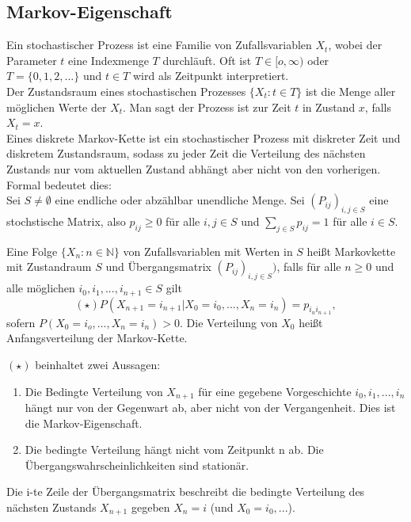 \documentclass[a4paper,12pt]{article}
\begin{document}
\subsection{Markov-Eigenschaft}
Ein stochastischer Prozess ist eine Familie von Zufallsvariablen $X_t$, wobei der Parameter $t$ eine Indexmenge $T$ durchläuft.
Oft ist $T \in [o,\infty )$ oder $T= \{0,1,2, ...\}$ und $t \in T$ wird als Zeitpunkt interpretiert.\\
Der Zustandsraum eines stochastischen Prozesses $\{ X_t: t \in T   \}$ ist die Menge aller möglichen Werte der $X_t$.
Man sagt der Prozess ist zur Zeit $t$ in Zustand $x$, falls $X_t =x$.\\
Eines diskrete Markov-Kette ist ein stochastischer Prozess mit diskreter Zeit und diskretem Zustandsraum, sodass zu jeder Zeit die Verteilung des nächsten Zustands nur vom aktuellen Zustand abhängt aber nicht von den vorherigen.
Formal bedeutet dies:\\
Sei $S \neq \emptyset  $ eine endliche oder abzählbar unendliche Menge. Sei $(P_{ij})_{i,j \in S}$ eine stochstische Matrix, also
$p_{ij} \geq 0$ für alle $i,j \in S$ und $\sum_{j\in S}p_{ij} = 1$ für alle $i \in S$.\\

\begin{tcolorbox}[breakable, colframe=green, colback=white, title=Satz 5]
	Eine Folge $\{X_n: n \in \mathbb{N}   \}$ von Zufallsvariablen mit Werten in $S$ heißt Markovkette mit Zustandraum $S$ und Übergangsmatrix $(P_{ij})_{i,j \in S})$, falls
	für alle $n \geq 0$ und alle möglichen $i_0, i_1, ..., i_{n+1} \in S$ gilt
	$$
		(\star) P(X_{n+1}=i_{n+1} | X_0 = i_{0}, ... , X_n = i_n) = p_{i_ni_{n+1}}
		,$$
	sofern $P(X_0 = i_o, ..., X_n = i_n) > 0$. Die Verteilung von $X_0$ heißt Anfangsverteilung der Markov-Kette.\\
\end{tcolorbox}

$(\star)$ beinhaltet zwei Aussagen:
\begin{enumerate}
	\item Die Bedingte Verteilung von $X_{n+1}$ für eine gegebene Vorgeschichte $i_0, i_1, ..., i_n$ hängt nur von der Gegenwart ab, aber nicht von der Vergangenheit. Dies ist die Markov-Eigenschaft.
	\item Die bedingte Verteilung hängt nicht vom Zeitpunkt n ab. Die Übergangswahrscheinlichkeiten sind stationär.
\end{enumerate}
Die i-te Zeile der Übergangsmatrix beschreibt die bedingte Verteilung des nächsten Zustands $X_{n+1}$ gegeben $X_n=i$ (und $X_0=i_0, ...$).
\end{document}
